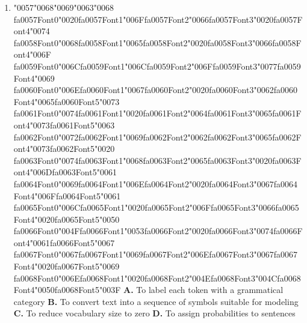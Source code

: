 \documentclass[11pt]{article}
\begin{document}
\begin{enumerate}[leftmargin=*]
  \item {\char"0057}{\char"0068}{\char"0069}{\char"0063}{\char"0068} {\csname fa0057Font0\endcsname\char"0020}{\csname fa0057Font1\endcsname\char"006F}{\csname fa0057Font2\endcsname\char"0066}{\csname fa0057Font3\endcsname\char"0020}{\csname fa0057Font4\endcsname\char"0074} {\csname fa0058Font0\endcsname\char"0068}{\csname fa0058Font1\endcsname\char"0065}{\csname fa0058Font2\endcsname\char"0020}{\csname fa0058Font3\endcsname\char"0066}{\csname fa0058Font4\endcsname\char"006F} {\csname fa0059Font0\endcsname\char"006C}{\csname fa0059Font1\endcsname\char"006C}{\csname fa0059Font2\endcsname\char"006F}{\csname fa0059Font3\endcsname\char"0077}{\csname fa0059Font4\endcsname\char"0069} {\csname fa0060Font0\endcsname\char"006E}{\csname fa0060Font1\endcsname\char"0067}{\csname fa0060Font2\endcsname\char"0020}{\csname fa0060Font3\endcsname\char"0062}{\csname fa0060Font4\endcsname\char"0065}{\csname fa0060Font5\endcsname\char"0073} {\csname fa0061Font0\endcsname\char"0074}{\csname fa0061Font1\endcsname\char"0020}{\csname fa0061Font2\endcsname\char"0064}{\csname fa0061Font3\endcsname\char"0065}{\csname fa0061Font4\endcsname\char"0073}{\csname fa0061Font5\endcsname\char"0063} {\csname fa0062Font0\endcsname\char"0072}{\csname fa0062Font1\endcsname\char"0069}{\csname fa0062Font2\endcsname\char"0062}{\csname fa0062Font3\endcsname\char"0065}{\csname fa0062Font4\endcsname\char"0073}{\csname fa0062Font5\endcsname\char"0020} {\csname fa0063Font0\endcsname\char"0074}{\csname fa0063Font1\endcsname\char"0068}{\csname fa0063Font2\endcsname\char"0065}{\csname fa0063Font3\endcsname\char"0020}{\csname fa0063Font4\endcsname\char"006D}{\csname fa0063Font5\endcsname\char"0061} {\csname fa0064Font0\endcsname\char"0069}{\csname fa0064Font1\endcsname\char"006E}{\csname fa0064Font2\endcsname\char"0020}{\csname fa0064Font3\endcsname\char"0067}{\csname fa0064Font4\endcsname\char"006F}{\csname fa0064Font5\endcsname\char"0061} {\csname fa0065Font0\endcsname\char"006C}{\csname fa0065Font1\endcsname\char"0020}{\csname fa0065Font2\endcsname\char"006F}{\csname fa0065Font3\endcsname\char"0066}{\csname fa0065Font4\endcsname\char"0020}{\csname fa0065Font5\endcsname\char"0050} {\csname fa0066Font0\endcsname\char"004F}{\csname fa0066Font1\endcsname\char"0053}{\csname fa0066Font2\endcsname\char"0020}{\csname fa0066Font3\endcsname\char"0074}{\csname fa0066Font4\endcsname\char"0061}{\csname fa0066Font5\endcsname\char"0067} {\csname fa0067Font0\endcsname\char"0067}{\csname fa0067Font1\endcsname\char"0069}{\csname fa0067Font2\endcsname\char"006E}{\csname fa0067Font3\endcsname\char"0067}{\csname fa0067Font4\endcsname\char"0020}{\csname fa0067Font5\endcsname\char"0069} {\csname fa0068Font0\endcsname\char"006E}{\csname fa0068Font1\endcsname\char"0020}{\csname fa0068Font2\endcsname\char"004E}{\csname fa0068Font3\endcsname\char"004C}{\csname fa0068Font4\endcsname\char"0050}{\csname fa0068Font5\endcsname\char"003F}
    \textbf{A.} To label each token with a grammatical category
    \textbf{B.} To convert text into a sequence of symbols suitable for modeling
    \textbf{C.} To reduce vocabulary size to zero
    \textbf{D.} To assign probabilities to sentences


\end{enumerate}
\end{document}
